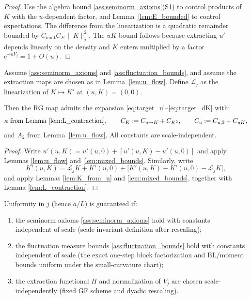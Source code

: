 \begin{proof}
Use the algebra bound \ref{ass:seminorm_axioms}(S1) to control products of $K$ with the $u$-dependent factor,
and Lemma~\ref{lem:E_bounded} to control expectations. The difference from the linearization is a quadratic remainder
bounded by $C_{\mathrm{mult}}C_E\,\|K\|_j^2$.
The $uK$ bound follows because extracting $u'$ depends linearly on the density and $K$ enters multiplied by a factor $e^{-uV_j}=1+O(u)$.
\end{proof}

\begin{theorem}\label{thm:RG_analytic_bounds}
Assume \ref{ass:seminorm_axioms} and \ref{ass:fluctuation_bounds}, and assume the extraction maps are chosen as in Lemma~\ref{lem:u_flow}.
Define $\mathcal L_j$ as the linearization of $K\mapsto K'$ at $(u,K)=(0,0)$.

Then the RG map admits the expansion \eqref{eq:target_u}--\eqref{eq:target_dK} with:
\[
\kappa\ \text{from Lemma \ref{lem:L_contraction}},\qquad
C_K:=C_{u\to K}+C_{K^2},\qquad
C_u:=C_{u,3}+C_{uK},
\]
and $A_2$ from Lemma~\ref{lem:u_flow}$.$
All constants are scale-independent.
\end{theorem}

\begin{proof}
Write $u'(u,K)=u'(u,0)+[u'(u,K)-u'(u,0)]$ and apply Lemmas \ref{lem:u_flow} and \ref{lem:mixed_bounds}.
Similarly, write
\[
K'(u,K)=\mathcal L_j K + K'(u,0) + \big[K'(u,K)-K'(u,0)-\mathcal L_jK\big],
\]
and apply Lemmas \ref{lem:K_from_u} and \ref{lem:mixed_bounds}, together with Lemma \ref{lem:L_contraction}.
\end{proof}

Uniformity in $j$ (hence $a/L$) is guaranteed if:
\begin{enumerate}[label=(U\arabic*)]
\item the seminorm axioms \ref{ass:seminorm_axioms} hold with constants independent of scale (scale-invariant definition after rescaling);
\item the fluctuation measure bounds \ref{ass:fluctuation_bounds} hold with constants independent of scale (the exact one-step block factorization and BL/moment bounds uniform under the small-curvature chart);
\item the extraction functional $\Pi$ and normalization of $V_j$ are chosen scale-independently (fixed GF scheme and dyadic rescaling).
\end{enumerate}

